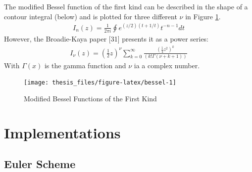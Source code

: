 \documentclass[12pt,twoside]{reedthesis}
\theoremstyle{definition}
\theoremstyle{definition}
\theoremstyle{remark}
\begin{document}
  The modified Bessel function of the first kind can be described in the
  shape of a contour integral (below) and is plotted for three different
  \(\nu\) in Figure \ref{fig:bessel}.
  \begin{align*} 
  I_n(z)= \frac{1}{2 \pi i}\displaystyle \oint e^{(z/2)(t+1/t)}t^{-n-1}dt
  \end{align*}
  However, the Broadie-Kaya paper {[}31{]} presents it as a power series:
  \begin{align*}
  I_{\nu}(z)= \left(\frac{1}{2}z\right)^\nu \displaystyle \sum_{k=0}^{\infty}{\frac{\left(\frac{1}{4}z^2\right)^k}{\left(k!\Gamma \left(\nu+k+1\right)\right)}}
  \end{align*}
  With \(\Gamma(x)\) is the gamma function and \(\nu\) ia a complex
  number.
  \begin{figure}
  
  {\centering \texttt{[image: thesis\_files/figure-latex/bessel-1]} 
  
  }
  
  \caption{Modified Bessel Functions of the First Kind \label{bessel}}\label{fig:bessel}
  \end{figure}
  \chapter{Implementations}\label{imps}
  
  \section{Euler Scheme}\label{eulerapp}
  
\end{document}
